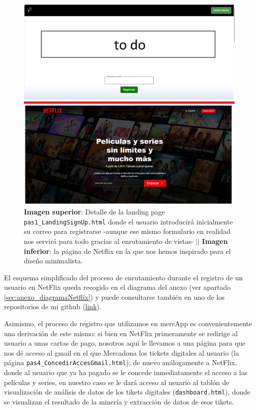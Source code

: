 \documentclass[a4paper,12pt]{report}
\begin{document}
	\setlength{\belowcaptionskip}{3pt}
	\FloatBarrier
	\begin{figure}[H]
		\centering
		\includegraphics[width=1\textwidth]{img/landingSignUp.png}
		\caption{\textbf{Imagen superior}: Detalle de la landing page \texttt{pas1\_LandingSignUp.html} donde el usuario introducirá inicialmente su correo para registrarse -aunque ese mismo formulario en realidad nos servirá para todo gracias al enrutamiento de vistas- $||$ \textbf{Imagen inferior}: la página de Netflix en la que nos hemos inspirado para el diseño minimalista.}
		\label{fig:landingSignUpDETALL} 
	\end{figure}
	\FloatBarrier
	
	El esquema simplificado del proceso de enrutamiento durante el registro de un usuario en NetFlix queda recogido en el diagrama del anexo (ver apartado \ref{sec:anexo_diagramaNetflix}) y puede consultarse también en uno de los repositorios de mi github (\href{https://www.github.com/miApp}{link}). 
	
	Asimismo, el proceso de registro que utilizamos en mercApp es convenientemente una derivación de este mismo: si bien en NetFlix primeramente se redirige al usuario a unas cartas de pago, nosotros aquí le llevamos a una página para que nos dé acceso al gmail en el que Mercadona los tickets digitales al usuario (la página  \texttt{pas4\_ConcedirAccesGmail.html}); de nuevo análogamente a NetFlix, donde al usuario que ya ha pagado se le concede inmediatamente el acceso a las películas y series,  en nuestro caso se le dará acceso al usuario al tablón de visualización de análisis de datos de los tikets digitales  (\texttt{dashboard.html}), donde se visualizan el resultado de la minería y extracción de datos de esos tikets. 
	
\end{document}
